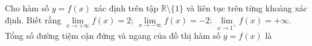 \begin{ex}
Cho hàm số $y=f(x)$ xác định trên tập $\mathbb R\setminus\{1\}$ và liên tục trên từng khoảng xác định. Biết rằng $\lim\limits_{x\to+\infty}f(x)=2$; $\lim\limits_{x\to-\infty}f(x)=-2$; $\lim\limits_{x\to1^+}f(x)=+\infty$. Tổng số đường tiệm cận đứng và ngang của đồ thị hàm số $y=f(x)$ là
\end{ex}
